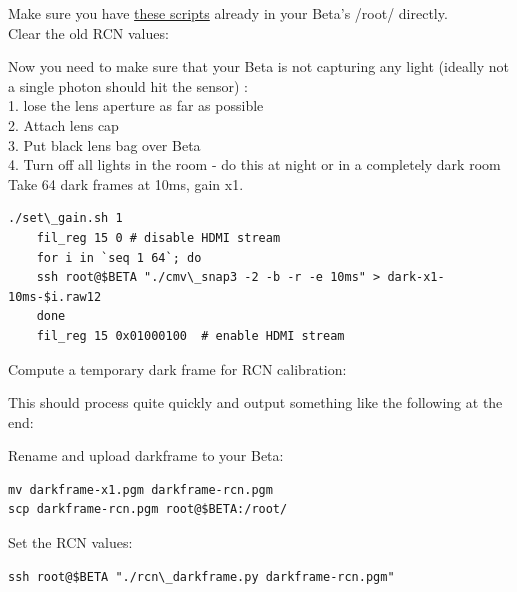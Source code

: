 Make sure you have \href{https://github.com/apertus-open-source-cinema/beta-software/tree/master/beta-scripts}{these scripts} already in your Beta's /root/ directly.\\
	
Clear the old RCN values: 
	
 
	
Now you need to make sure that your Beta is not capturing any light (ideally not a single photon should hit the sensor) :\\
	
1. lose the lens aperture as far as possible\\
2. Attach lens cap\\
3. Put black lens bag over Beta\\
4. Turn off all lights in the room - do this at night or in a completely dark room \\
	
Take 64 dark frames at 10ms, gain x1. 
	
\begin{lstlisting}[breaklines=true, breakatwhitespace=true]
	./set\_gain.sh 1
	fil_reg 15 0 # disable HDMI stream
	for i in `seq 1 64`; do
	ssh root@$BETA "./cmv\_snap3 -2 -b -r -e 10ms" > dark-x1-10ms-$i.raw12 
	done 
	fil_reg 15 0x01000100  # enable HDMI stream
\end{lstlisting}
	
Compute a temporary dark frame for RCN calibration: 
	
	
This should process quite quickly and output something like the following at the end: 
	

Rename and upload darkframe to your Beta:  

\begin{lstlisting}[breaklines=true, breakatwhitespace=true]
mv darkframe-x1.pgm darkframe-rcn.pgm
scp darkframe-rcn.pgm root@$BETA:/root/
\end{lstlisting} 

Set the RCN values: 

\begin{lstlisting}[breaklines=true, breakatwhitespace=true]
ssh root@$BETA "./rcn\_darkframe.py darkframe-rcn.pgm"
\end{lstlisting} 

